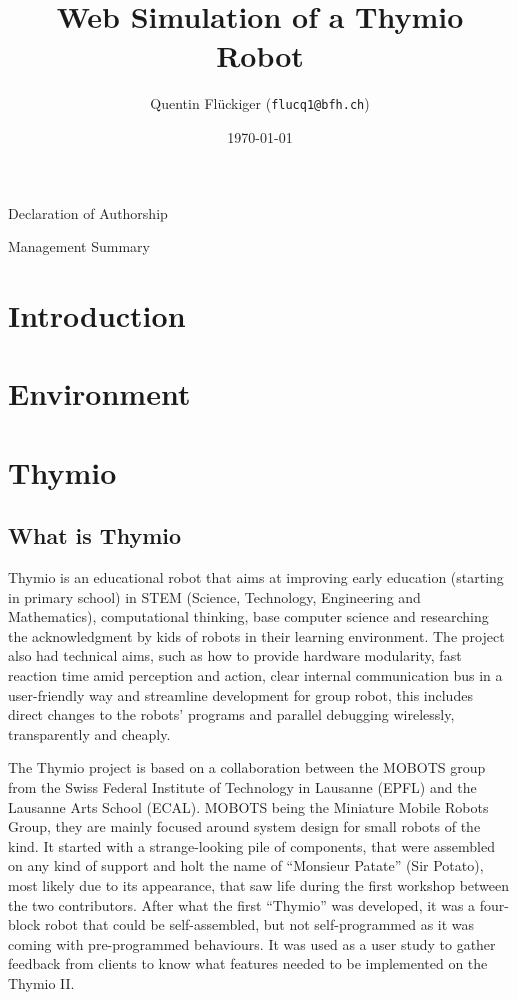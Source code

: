 \documentclass{scrartcl}
\begin{document}
\title{Web Simulation of a Thymio Robot}
\date{\today}   %
\author{Quentin Flückiger (\texttt{flucq1@bfh.ch})}





\maketitle
\clearpage

Declaration of Authorship
\clearpage
\clearpage

Management Summary
\clearpage
\clearpage

\tableofcontents
\clearpage

\section{Introduction}

\section{Environment}

\section{Thymio}
\subsection{What is Thymio} 

Thymio is an educational robot that aims at improving early education (starting in primary school) in STEM (Science, Technology, Engineering and Mathematics),
computational thinking, base computer science and researching the acknowledgment by kids of robots in their learning environment.
The project also had technical aims, such as how to provide hardware modularity, fast reaction time amid perception and action,
clear internal communication bus in a user-friendly way and streamline development for group robot, this includes direct changes to the robots’ programs and parallel debugging wirelessly, 
transparently and cheaply.

The Thymio project is based on a collaboration between the MOBOTS group from the Swiss Federal Institute of Technology in Lausanne (EPFL) and the Lausanne Arts School (ECAL).
MOBOTS being the Miniature Mobile Robots Group, they are mainly focused around system design for small robots of the kind. It started with a strange-looking pile of components, 
that were assembled on any kind of support and holt the name of “Monsieur Patate” (Sir Potato), most likely due to its appearance, 
that saw life during the first workshop between the two contributors. After what the first “Thymio” was developed, 
it was a four-block robot that could be self-assembled, but not self-programmed as it was coming with pre-programmed behaviours. 
It was used as a user study to gather feedback from clients to know what features needed to be implemented on the Thymio II.
\end{document}
